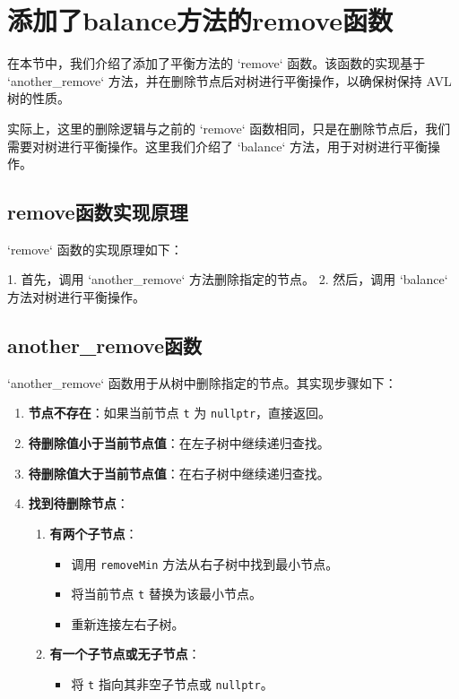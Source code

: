 \documentclass[UTF8]{ctexart}
\begin{document}
\pagestyle{fancy}
\fancyhead{}
\rhead{\today}

\section{添加了balance方法的remove函数}

在本节中，我们介绍了添加了平衡方法的 `remove` 函数。该函数的实现基于 `another\_remove` 方法，并在删除节点后对树进行平衡操作，以确保树保持 AVL 树的性质。

实际上，这里的删除逻辑与之前的 `remove` 函数相同，只是在删除节点后，我们需要对树进行平衡操作。这里我们介绍了 `balance` 方法，用于对树进行平衡操作。

\subsection{remove函数实现原理}

`remove` 函数的实现原理如下：

1. 首先，调用 `another\_remove` 方法删除指定的节点。
2. 然后，调用 `balance` 方法对树进行平衡操作。

\subsection{another\_remove函数}

`another\_remove` 函数用于从树中删除指定的节点。其实现步骤如下：

\begin{enumerate}
    \item \textbf{节点不存在}：如果当前节点 \verb|t| 为 \verb|nullptr|，直接返回。
    \item \textbf{待删除值小于当前节点值}：在左子树中继续递归查找。
    \item \textbf{待删除值大于当前节点值}：在右子树中继续递归查找。
    \item \textbf{找到待删除节点}：
    \begin{enumerate}
        \item \textbf{有两个子节点}：
        \begin{itemize}
            \item 调用 \verb|removeMin| 方法从右子树中找到最小节点。
            \item 将当前节点 \verb|t| 替换为该最小节点。
            \item 重新连接左右子树。
        \end{itemize}
        \item \textbf{有一个子节点或无子节点}：
        \begin{itemize}
            \item 将 \verb|t| 指向其非空子节点或 \verb|nullptr|。
        \end{itemize}
    \end{enumerate}
\end{enumerate}
\end{document}
